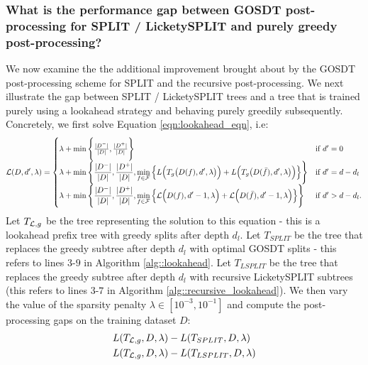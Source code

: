 \subsubsection{What is the performance gap between GOSDT post-processing for SPLIT / LicketySPLIT and purely greedy post-processing?}
We now examine the the additional improvement brought about by the GOSDT post-processing scheme for SPLIT and the recursive post-processing. 
We next illustrate the gap between SPLIT / LicketySPLIT trees and a tree that is trained purely using a lookahead strategy and behaving purely greedily subsequently. Concretely, we first solve Equation \ref{eqn:lookahead_eqn}, i.e:
\begin{align}
\label{eqn:lookahead_eqn}
    \mathcal{L}(D, d^\prime, \lambda) = 
    \begin{cases}
    \lambda + \min\Bigg\{\frac{|D^-|}{|D|}, \frac{|D^+|}{|D|}\Bigg\} &  \text{if $d^\prime=0$}\\
    \begin{aligned}
        \lambda + \min\Bigg\{\frac{|D^-|}{|D|}, \frac{|D^+|}{|D|},\min_{f \in \mathcal{F}}\Big\{L\Big(T_g\big(D(f),d^\prime, \lambda\big)\Big) + L\Big(T_g\big(D(\bar{f}), d^\prime, \lambda\big)\Big)\Big\}\Bigg\} \end{aligned} &  \text{if $d^\prime = d-d_l$} \\
    \begin{aligned}
    \lambda + \min\Bigg\{\frac{|D^-|}{|D|},\frac{|D^+|}{|D|},\min_{f \in \mathcal{F}}\Big\{\mathcal{L}\Big(D(f), d^\prime-1, \lambda\Big) + \mathcal{L}\Big(D(\bar{f}), d^\prime-1, \lambda\Big)\Big\}
        \Bigg\}\end{aligned} & \text{if $d^\prime > d-d_l$.}
    \end{cases}
\end{align}
Let $T_{\mathcal{L}, g}$ be the tree representing the solution to this equation - this is a lookahead prefix tree with greedy splits after depth $d_l$. Let $T_{SPLIT}$ be the tree that replaces the greedy subtree after depth $d_l$ with optimal GOSDT splits - this refers to lines $3$-$9$ in Algorithm \ref{alg::lookahead}. Let $T_{LSPLIT}$ be the tree that replaces the greedy subtree after depth $d_l$ with recursive LicketySPLIT subtrees (this refers to lines $3$-$7$ in Algorithm \ref{alg::recursive_lookahead}). We then vary the value of the sparsity penalty $\lambda \in [10^{-3},10^{-1}]$ and compute the post-processing gaps on the training dataset $D$: 
\begin{align}
    & L(T_{\mathcal{L}, g}, D, \lambda) - L(T_{SPLIT}, D, \lambda)\\ 
    &L(T_{\mathcal{L}, g}, D, \lambda) - L(T_{LSPLIT}, D, \lambda)
\end{align}

